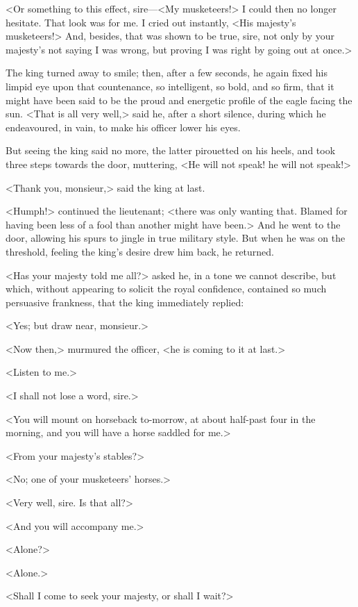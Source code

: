 <Or something to this effect, sire—<My musketeers!> I could then no longer hesitate. That look was for me. I cried out instantly, <His majesty's musketeers!> And, besides, that was shown to be true, sire, not only by your majesty's not saying I was wrong, but proving I was right by going out at once.>

The king turned away to smile; then, after a few seconds, he again fixed his limpid eye upon that countenance, so intelligent, so bold, and so firm, that it might have been said to be the proud and energetic profile of the eagle facing the sun. <That is all very well,> said he, after a short silence, during which he endeavoured, in vain, to make his officer lower his eyes.

But seeing the king said no more, the latter pirouetted on his heels, and took three steps towards the door, muttering, <He will not speak!  he will not speak!>

<Thank you, monsieur,> said the king at last.

<Humph!> continued the lieutenant; <there was only wanting that. Blamed for having been less of a fool than another might have been.> And he went to the door, allowing his spurs to jingle in true military style. But when he was on the threshold, feeling the king's desire drew him back, he returned.

<Has your majesty told me all?> asked he, in a tone we cannot describe, but which, without appearing to solicit the royal confidence, contained so much persuasive frankness, that the king immediately replied:

<Yes; but draw near, monsieur.>

<Now then,> murmured the officer, <he is coming to it at last.>

<Listen to me.>

<I shall not lose a word, sire.>

<You will mount on horseback to-morrow, at about half-past four in the morning, and you will have a horse saddled for me.>

<From your majesty's stables?>

<No; one of your musketeers' horses.>

<Very well, sire. Is that all?>

<And you will accompany me.>

<Alone?>

<Alone.>

<Shall I come to seek your majesty, or shall I wait?>

